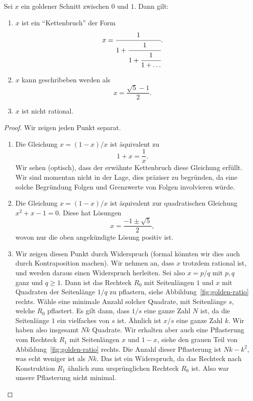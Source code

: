 \documentclass[../main.tex]{subfiles}
\begin{document}
\begin{proposition}
  Sei $x$ ein goldener Schnitt zwischen $0$ und $1$. Dann gilt:
  \begin{enumerate}[(1)]
    \item $x$ ist ein ``Kettenbruch'' der Form
      \[
        x = \cfrac{1}{1 + \cfrac{1}{1 + \cfrac{1}{1 + \dots}}}.
      \]
    \item $x$ kann geschribeben werden als
      \[
        x = \frac{\sqrt{5} - 1}{2}.
      \]
    \item $x$ ist nicht rational.
  \end{enumerate}
\end{proposition}

\begin{proof}
  Wir zeigen jeden Punkt separat.
  \begin{enumerate}[(1)]
    \item Die Gleichung $x = (1-x)/x$ ist äquivalent zu
      \[
        1 + x = \frac{1}{x}.
      \]
      Wir sehen (optisch), dass der erwähnte Kettenbruch diese Gleichung erfüllt.
      Wir sind momentan nicht in der Lage, dies präziser zu begründen,
      da eine solche Begründung Folgen und Grenzwerte von Folgen
      involvieren würde.
    \item Die Gleichung $x = (1-x)/x$ ist äquivalent zur
      quadratischen Gleichung $x^2 + x - 1 = 0$.
      Diese hat Lösungen
      \[
        x = \frac{-1 \pm \sqrt{5}}{2},
      \]
      wovon nur die oben angekündigte Lösung positiv ist.
    \item Wir zeigen diesen Punkt durch Widerspruch
      (formal könnten wir dies auch durch Kontraposition
      machen).
      Wir nehmen an, dass $x$ trotzdem rational ist,
      und werden daraus einen Widerspruch herleiten.
      Sei also $x = p/q$ mit $p, q$ ganz
      und $q \geq 1$.
      Dann ist das Rechteck $R_0$ mit Seitenlängen
      $1$ und $x$ mit Quadraten der Seitenlänge
      $1/q$ zu pflastern, siehe Abbildung~\ref{fig:golden-ratio} rechts.
      Wähle eine minimale Anzahl solcher Quadrate,
      mit Seitenlänge $s$,
      welche $R_0$ pflastert.
      Es gilt dann, dass $1/s$ eine ganze Zahl $N$ ist,
      da die Seitenlänge $1$ ein vielfaches von $s$ ist.
      Ähnlich ist $x/s$ eine ganze Zahl $k$.
      Wir haben also insgesamt $Nk$ Quadrate.
      Wir erhalten aber auch eine Pflasterung vom
      Rechteck $R_1$ mit Seitenlängen $x$ und $1-x$,
      siehe den grauen Teil von Abbildung~\ref{fig:golden-ratio}
      rechts.
      Die Anzahl dieser Pflasterung ist $Nk - k^2$, was echt weniger
      ist als $Nk$.
      Das ist ein Widerspruch, da das Rechteck nach Konstruktion
      $R_1$ ähnlich
      zum ursprünglichen Rechteck $R_0$ ist.
      Also war unsere Pflasterung nicht minimal.
      \qedhere
  \end{enumerate}
\end{proof}
\end{document}
